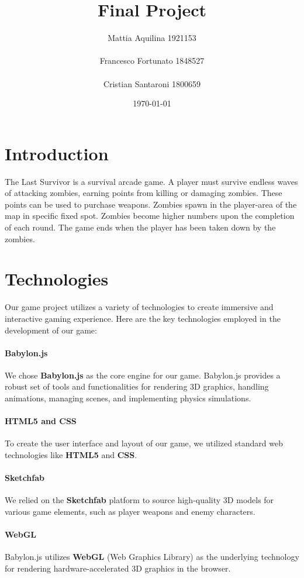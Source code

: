 \documentclass[12pt,a4paper,oneside]{article}
\title{Final Project}	                                    %
\author{Mattia Aquilina 1921153 \\\\ Francesco Fortunato 1848527    \\\\ Cristian Santaroni 1800659 }
\date{\today}									    %
\theoremstyle{definition}
\begin{document}


\tableofcontents
\newpage

\section{Introduction}

The Last Survivor is a survival arcade game. A player must survive endless waves of attacking zombies, earning points from killing or damaging zombies. These points can be used to purchase weapons. Zombies spawn in the player-area of the map in specific fixed spot.
Zombies become higher numbers upon the completion of each round.
The game ends when the player has been taken down by the zombies. 


\section{Technologies}
Our game project utilizes a variety of technologies to create immersive and interactive gaming experience. Here are the key technologies employed in the development of our game:
\paragraph{Babylon.js}
We chose \textbf{Babylon.js} as the core engine for our game. Babylon.js provides a robust set of tools and functionalities for rendering 3D graphics, handling animations, managing scenes, and implementing physics simulations. 
\paragraph{HTML5 and CSS}
To create the user interface and layout of our game, we utilized standard web technologies like \textbf{HTML5} and \textbf{CSS}. 

\paragraph{Sketchfab}
We relied on the \textbf{Sketchfab} platform to source high-quality 3D models for various game elements, such as player weapons and enemy characters.

\paragraph{WebGL}
Babylon.js utilizes \textbf{WebGL} (Web Graphics Library) as the underlying technology for rendering hardware-accelerated 3D graphics in the browser.
\end{document}
